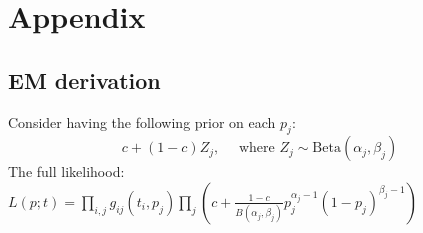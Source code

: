 \documentclass[11pt]{article}
\begin{document}




\clearpage
\section{Appendix}

%
%
%
%

\subsection*{EM derivation}
Consider having the following prior on each $p_j$: 
$$
c + (1-c)Z_j, \quad \text{ where } Z_j \sim \text{Beta}(\alpha_j, \beta_j) 
$$
The full likelihood: 
$L(p; t) = \prod_{i,j} g_{ij}(t_i,p_j) \prod_j \left( c+ \frac{1-c}{B(\alpha_j, \beta_j)} p_j^{\alpha_j-1} (1-p_j)^{\beta_j-1}  \right) $
\end{document}
